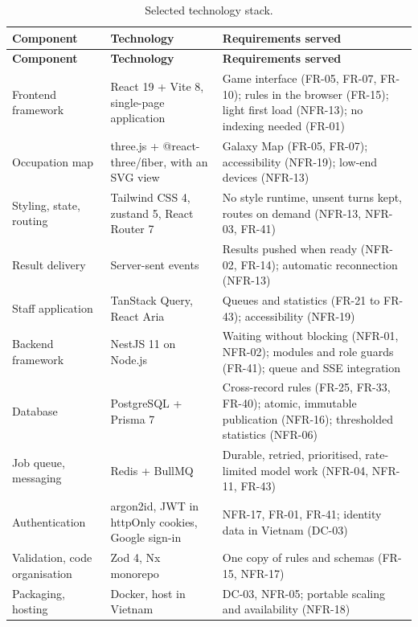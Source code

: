 {\small
\begin{longtable}{|>{\raggedright\arraybackslash}p{}|>{\raggedright\arraybackslash}p{}|>{\raggedright\arraybackslash}p{}|}
\caption{Selected technology stack.} \\
\hline
\textbf{Component} & \textbf{Technology} & \textbf{Requirements served} \\ \hline
\endfirsthead
\hline
\textbf{Component} & \textbf{Technology} & \textbf{Requirements served} \\ \hline
\endhead
Frontend framework & React 19 + Vite 8, single-page application & Game interface (FR-05, FR-07, FR-10); rules in the browser (FR-15); light first load (NFR-13); no indexing needed (FR-01) \\ \hline
Occupation map & three.js + @react-three/fiber, with an SVG view & Galaxy Map (FR-05, FR-07); accessibility (NFR-19); low-end devices (NFR-13) \\ \hline
Styling, state, routing & Tailwind CSS 4, zustand 5, React Router 7 & No style runtime, unsent turns kept, routes on demand (NFR-13, NFR-03, FR-41) \\ \hline
Result delivery & Server-sent events & Results pushed when ready (NFR-02, FR-14); automatic reconnection (NFR-13) \\ \hline
Staff application & TanStack Query, React Aria & Queues and statistics (FR-21 to FR-43); accessibility (NFR-19) \\ \hline
Backend framework & NestJS 11 on Node.js & Waiting without blocking (NFR-01, NFR-02); modules and role guards (FR-41); queue and SSE integration \\ \hline
Database & PostgreSQL + Prisma 7 & Cross-record rules (FR-25, FR-33, FR-40); atomic, immutable publication (NFR-16); thresholded statistics (NFR-06) \\ \hline
Job queue, messaging & Redis + BullMQ & Durable, retried, prioritised, rate-limited model work (NFR-04, NFR-11, FR-43) \\ \hline
Authentication & argon2id, JWT in httpOnly cookies, Google sign-in & NFR-17, FR-01, FR-41; identity data in Vietnam (DC-03) \\ \hline
Validation, code organisation & Zod 4, Nx monorepo & One copy of rules and schemas (FR-15, NFR-17) \\ \hline
Packaging, hosting & Docker, host in Vietnam & DC-03, NFR-05; portable scaling and availability (NFR-18) \\ \hline

\end{longtable}}
